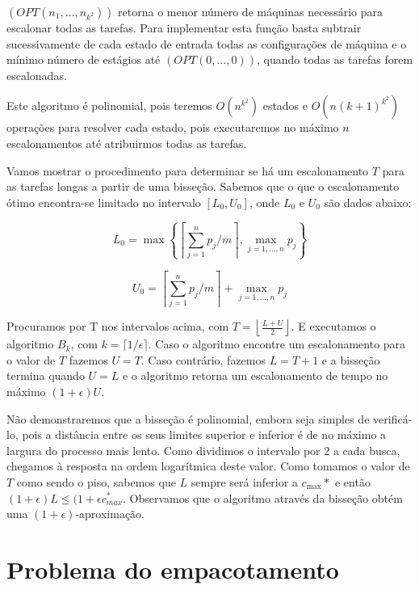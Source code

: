$(OPT(n_1, \ldots, n_{k^2}))$ retorna o menor número de máquinas necessário para escalonar todas as tarefas. Para implementar esta função basta subtrair sucessivamente de cada estado de entrada todas as configurações de máquina e o mínimo número de estágios até $(OPT(0, \ldots, 0))$, quando todas as tarefas forem escalonadas.

Este algoritmo é polinomial, pois teremos $O(n^{k^2})$ estados e $O(n(k+1)^{k^2})$ operações para resolver cada estado, pois executaremos no máximo $n$ escalonamentos até atribuirmos todas as tarefas.

Vamos mostrar o procedimento para determinar se há um escalonamento $T$ para as tarefas longas a partir de uma bisseção. Sabemos que o que o escalonamento ótimo encontra-se limitado no intervalo $\left[L_0, U_0\right]$, onde $L_0$ e $U_0$ são dados abaixo:

\begin{equation}
L_0 = \max\left\{\left\lceil \sum_{j=1}^{n} p_j / m \right\rceil, \max_{j=1,\ldots,n} p_j \right\}
\end{equation}

\begin{equation}
U_0 = \left\lceil \sum_{j=1}^{n} p_j / m \right\rceil + \max_{j=1,\ldots,n} p_j 
\end{equation}

Procuramos por T nos intervalos acima, com $T=\left \lfloor \frac{L+U}
{2} \right \rfloor$. E executamos o algoritmo $B_k$, com $k = \lceil 1/ \epsilon \rceil$. Caso o algoritmo encontre um escalonamento para o valor de $T$ fazemos $U=T$. Caso contrário, fazemos $L=T+1$ e a bisseção termina quando $U=L$ e o algoritmo retorna um escalonamento de tempo no máximo $(1+\epsilon)U$. 

Não demonstraremos que a bisseção é polinomial, embora seja simples de verificá-lo, pois a distância entre os seus limites superior e inferior é de no máximo a largura do processo mais lento. Como dividimos o intervalo por 2 a cada busca, chegamos à resposta na ordem logarítmica deste valor. Como tomamos o valor de $T$ como sendo o piso, sabemos que $L$ sempre será inferior a $c_{\max}*$ e então $(1+\epsilon)L \leq (1+\epsilon c_{max}^*$. Observamos que o algoritmo através da bisseção obtém uma $(1+\epsilon)$-aproximação.

\section{Problema do empacotamento}
\label{sec:empacotamento}

